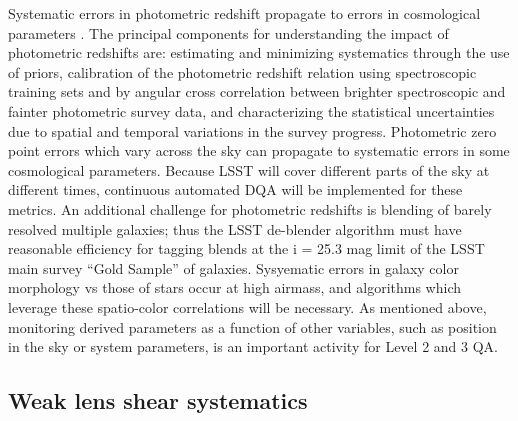 \documentclass[SE,toc,lsstdraft]{lsstdoc}
\begin{document}
Systematic errors in photometric redshift propagate to errors in cosmological parameters \citep{2011ApJ...734...36A}. The principal components for understanding the impact of photometric redshifts are: estimating and minimizing systematics through the use of priors, calibration of the photometric redshift relation using spectroscopic training sets and by angular cross correlation between brighter spectroscopic and fainter photometric survey data, and characterizing the statistical uncertainties due to spatial and temporal variations in the survey progress.  Photometric zero point errors \citep{2010SPIE.7737E..1FJ} which vary across the sky can propagate to systematic errors in some cosmological parameters. Because LSST will cover different parts of the sky at different times, continuous automated DQA will be implemented for these metrics. An additional challenge for photometric redshifts is blending of barely resolved multiple galaxies; thus the LSST de-blender algorithm must have reasonable efficiency for tagging blends at the i = 25.3 mag limit of the LSST main survey ``Gold Sample'' of galaxies. Sysyematic errors in galaxy color morphology vs those of stars occur at high airmass, and algorithms which leverage these spatio-color correlations will be necessary.  As mentioned above, monitoring derived parameters as a function of other variables, such as position in the sky or system parameters, is an important activity for Level 2 and 3 QA.

\subsection{Weak lens shear systematics}
\end{document}
